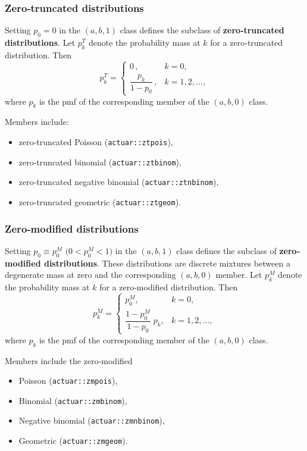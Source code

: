 \documentclass[11pt]{article}
\newcommand{\noi}{\noindent}
\begin{document}
\subsubsection{Zero‐truncated distributions}
\noi Setting $p_0=0$ in the \((a,b,1)\) class defines the subclass of \textbf{zero‐truncated distributions}.  Let $p_k^T$ denote the probability mass at $k$ for a zero‐truncated distribution.  Then
\[
p_k^T
=\begin{cases}
0\,,&k=0,\\[0.3em]
\dfrac{p_k}{1-p_0}\,,&k=1,2,\dots,
\end{cases}
\]
where $p_k$ is the pmf of the corresponding member of the \((a,b,0)\) class.  

\noi Members include:
\begin{itemize}
  \item zero‐truncated Poisson (\texttt{actuar::ztpois}),
  \item zero‐truncated binomial (\texttt{actuar::ztbinom}),
  \item zero‐truncated negative binomial (\texttt{actuar::ztnbinom}),
  \item zero‐truncated geometric (\texttt{actuar::ztgeom}).
\end{itemize}

\subsubsection{Zero‐modified distributions}
\noi Setting \(p_0\equiv p_0^M\) \(\bigl(0<p_0^M<1\bigr)\) in the \((a,b,1)\) class defines the subclass of \textbf{zero‐modified distributions}.  These distributions are discrete mixtures between a degenerate mass at zero and the corresponding \((a,b,0)\) member.  Let \(p_k^M\) denote the probability mass at \(k\) for a zero‐modified distribution.  Then
\[
p_k^M
=\begin{cases}
p_0^M, & k = 0,\\[0.3em]
\dfrac{1 - p_0^M}{\,1 - p_0\,}\;p_k, & k = 1,2,\dots,
\end{cases}
\]
where \(p_k\) is the pmf of the corresponding member of the \((a,b,0)\) class.  

\noi Members include the zero‐modified
\begin{itemize}
  \item Poisson (\texttt{actuar::zmpois}),
  \item Binomial (\texttt{actuar::zmbinom}),
  \item Negative binomial (\texttt{actuar::zmnbinom}),
  \item Geometric (\texttt{actuar::zmgeom}).
\end{itemize} \phantom{i}
\end{document}
